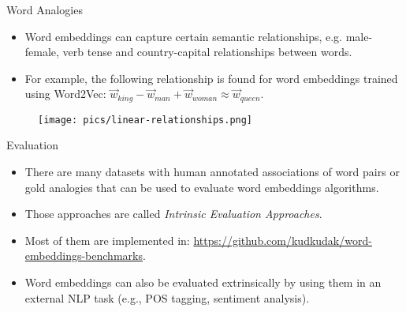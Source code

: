 \documentclass[handout]{beamer}
\begin{document}
\begin{frame}{Word Analogies}
\begin{scriptsize}
\begin{itemize}
   
\item Word embeddings can capture certain semantic relationships, e.g. male-female, verb tense and country-capital relationships between words.

\item For example, the following relationship is found for word embeddings
trained using Word2Vec: $\vec{w}_{king} - \vec{w}_{man} + \vec{w}_{woman} \approx \vec{w}_{queen}$.

    
\end{itemize}

 \begin{figure}[h]
    	\texttt{[image: pics/linear-relationships.png]}
    \end{figure}

\end{scriptsize}
\end{frame}


\begin{frame}{Evaluation}
\begin{scriptsize}
\begin{itemize}
   
\item There are many datasets with human annotated associations of word pairs or gold analogies that can be used to evaluate word embeddings algorithms.

\item Those approaches are called \textit{Intrinsic Evaluation Approaches}.

\item Most of them are implemented in: \url{https://github.com/kudkudak/word-embeddings-benchmarks}.

\item Word embeddings can also be evaluated extrinsically by using them in an external NLP task (e.g., POS tagging, sentiment analysis).

    
\end{itemize}



\end{scriptsize}
\end{frame}
\end{document}
